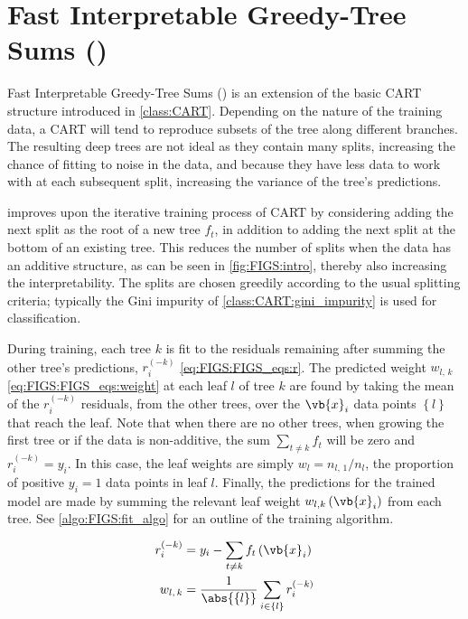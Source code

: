 \section{Fast Interpretable Greedy-Tree Sums (\figs)}
\label{class:FIGS}

Fast Interpretable Greedy-Tree Sums (\figs) \cite{FIGS,G-FIGS}
is an extension of the basic CART structure introduced in \cref{class:CART}.
Depending on the nature of the training data,
a CART will tend to reproduce subsets of the tree along different branches.
The resulting deep trees are not ideal as they contain many splits,
increasing the chance of fitting to noise in the data,
and because they have less data to work with at each subsequent split,
increasing the variance of the tree's predictions.

\figs improves upon the iterative training process of CART
by considering adding the next split as the root of a new tree $f_{t}$,
in addition to adding the next split at the bottom of an existing tree.
This reduces the number of splits when the data has an additive structure,
as can be seen in \cref{fig:FIGS:intro}, thereby also increasing the interpretability.
The splits are chosen greedily according to the usual splitting criteria;
typically the Gini impurity of \cref{class:CART:gini_impurity} is used for classification.

During training, each tree $k$ is fit to the residuals remaining after summing the other tree's predictions,
$r_{i}^{\left(-k\right)}$ \cref{eq:FIGS:FIGS_eqs:r}.
The predicted weight $w_{l,\,k}$ \cref{eq:FIGS:FIGS_eqs:weight} at each leaf $l$ of tree $k$
are found by taking the mean of the $r_{i}^{\left(-k\right)}$ residuals, from the other trees,
over the $\vb{x}_{i}$ data points $\left\{l\right\}$ that reach the leaf.
Note that when there are no other trees,
\eg when growing the first tree or if the data is non-additive,
the sum $\sum_{t \neq k} f_{t}$ will be zero and $r_{i}^{\left(-k\right)} = y_{i}$.
In this case, the leaf weights are simply $w_{l} = n_{l,\,1}/n_{l}$,
\ie the proportion of positive $y_{i} = 1$ data points in leaf $l$.
Finally, the predictions for the trained model are made by
summing the relevant leaf weight $w_{l,k}\left(\vb{x}_{i}\right)$ from each tree.
See \cref{algo:FIGS:fit_algo} for an outline of the training algorithm.

\begin{subequations}\label{eq:FIGS_eqs}
\begin{align}
r_{i}^{\left(-k\right)} &= y_{i} - \sum_{t \neq k} f_{t}\left(\vb{x}_{i}\right) \label{eq:FIGS:FIGS_eqs:r} \\
w_{l,\,k} &= \frac{1}{\abs{\left\{l\right\}}} \sum_{i \in \left\{l\right\}} r_{i}^{\left(-k\right)} \label{eq:FIGS:FIGS_eqs:weight}
\end{align}
\end{subequations}

